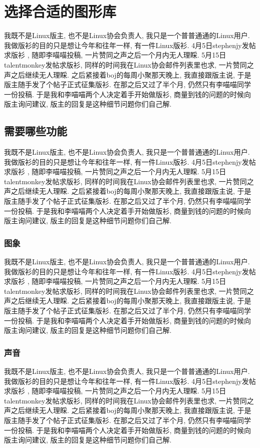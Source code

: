 \chapter{选择合适的图形库}
我既不是Linux版主, 也不是Linux协会负责人, 我只是一个普普通通的Linux用户. 我做版衫的目的只是想让今年和往年一样, 有一件Linux版衫. 4月5日stephenjy发帖求版衫 , 随即李喵喵投稿, 一片赞同之声之后一个月内无人理睬. 5月15日talentmonkey发帖求版衫, 同样的时间我在Linux协会邮件列表里也求, 一片赞同之声之后继续无人理睬. 之后紧接着boj的每周小聚那天晚上, 我直接跟版主说, 于是版主随手发了个帖子正式征集版衫. 在那之后又过了半个月, 仍然只有李喵喵同学一份投稿. 于是我和李喵喵两个人决定着手开始做版衫, 商量到钱的问题的时候向版主询问建议, 版主的回复是这种细节问题你们自己解.
\section{需要哪些功能}
我既不是Linux版主, 也不是Linux协会负责人, 我只是一个普普通通的Linux用户. 我做版衫的目的只是想让今年和往年一样, 有一件Linux版衫. 4月5日stephenjy发帖求版衫 , 随即李喵喵投稿, 一片赞同之声之后一个月内无人理睬. 5月15日talentmonkey发帖求版衫, 同样的时间我在Linux协会邮件列表里也求, 一片赞同之声之后继续无人理睬. 之后紧接着boj的每周小聚那天晚上, 我直接跟版主说, 于是版主随手发了个帖子正式征集版衫. 在那之后又过了半个月, 仍然只有李喵喵同学一份投稿. 于是我和李喵喵两个人决定着手开始做版衫, 商量到钱的问题的时候向版主询问建议, 版主的回复是这种细节问题你们自己解.
\subsection{图象}
我既不是Linux版主, 也不是Linux协会负责人, 我只是一个普普通通的Linux用户. 我做版衫的目的只是想让今年和往年一样, 有一件Linux版衫. 4月5日stephenjy发帖求版衫 , 随即李喵喵投稿, 一片赞同之声之后一个月内无人理睬. 5月15日talentmonkey发帖求版衫, 同样的时间我在Linux协会邮件列表里也求, 一片赞同之声之后继续无人理睬. 之后紧接着boj的每周小聚那天晚上, 我直接跟版主说, 于是版主随手发了个帖子正式征集版衫. 在那之后又过了半个月, 仍然只有李喵喵同学一份投稿. 于是我和李喵喵两个人决定着手开始做版衫, 商量到钱的问题的时候向版主询问建议, 版主的回复是这种细节问题你们自己解.
\subsection{声音}
我既不是Linux版主, 也不是Linux协会负责人, 我只是一个普普通通的Linux用户. 我做版衫的目的只是想让今年和往年一样, 有一件Linux版衫. 4月5日stephenjy发帖求版衫 , 随即李喵喵投稿, 一片赞同之声之后一个月内无人理睬. 5月15日talentmonkey发帖求版衫, 同样的时间我在Linux协会邮件列表里也求, 一片赞同之声之后继续无人理睬. 之后紧接着boj的每周小聚那天晚上, 我直接跟版主说, 于是版主随手发了个帖子正式征集版衫. 在那之后又过了半个月, 仍然只有李喵喵同学一份投稿. 于是我和李喵喵两个人决定着手开始做版衫, 商量到钱的问题的时候向版主询问建议, 版主的回复是这种细节问题你们自己解.
